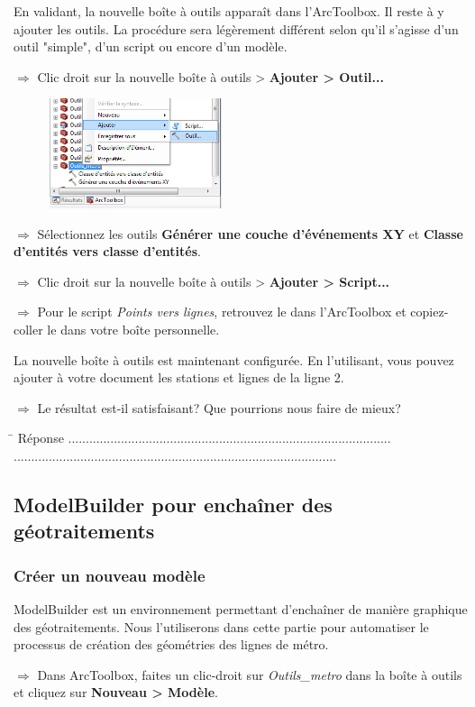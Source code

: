 \documentclass[11pt]{article}
\newcommand{\action}{$\Rightarrow$ }
\newcommand{\reponse}{
	\begin{tabbing}
	\hspace{2cm}\=\kill
	Réponse \> ............................................................................................ \\
 	\> ............................................................................................
	\end{tabbing}
}
\begin{document}
En validant, la nouvelle boîte à outils apparaît dans l'ArcToolbox. Il reste à y ajouter les outils. La procédure sera légèrement différent selon qu'il s'agisse d'un outil "simple", d'un script ou encore d'un modèle.

\action Clic droit sur la nouvelle boîte à outils > \textbf{Ajouter > Outil...}
\begin{figure}[H]
	\center \includegraphics[width=0.45\textwidth]{img/td3/arctoolbox_ajouter-3.png}\\
\end{figure}

\action Sélectionnez les outils \textbf{Générer une couche d'événements XY} et \textbf{Classe d'entités vers classe d'entités}.

\action Clic droit sur la nouvelle boîte à outils > \textbf{Ajouter > Script...}

\action Pour le script \textit{Points vers lignes}, retrouvez le dans l'ArcToolbox et copiez-coller le dans votre boîte personnelle.

La nouvelle boîte à outils est maintenant configurée. En l'utilisant, vous pouvez ajouter à votre document les stations et lignes de la ligne 2.

\action Le résultat est-il satisfaisant? Que pourrions nous faire de mieux?

\reponse


\subsection{ModelBuilder pour enchaîner des géotraitements}
\label{modelbuilder}
\subsubsection{Créer un nouveau modèle}
ModelBuilder est un environnement permettant d'enchaîner de manière graphique des géotraitements. Nous l'utiliserons dans cette partie pour automatiser le processus de création des géométries des lignes de métro.

\action Dans ArcToolbox, faites un clic-droit sur \textit{Outils\_metro} dans la boîte à outils et cliquez sur \textbf{Nouveau > Modèle}.
\end{document}
